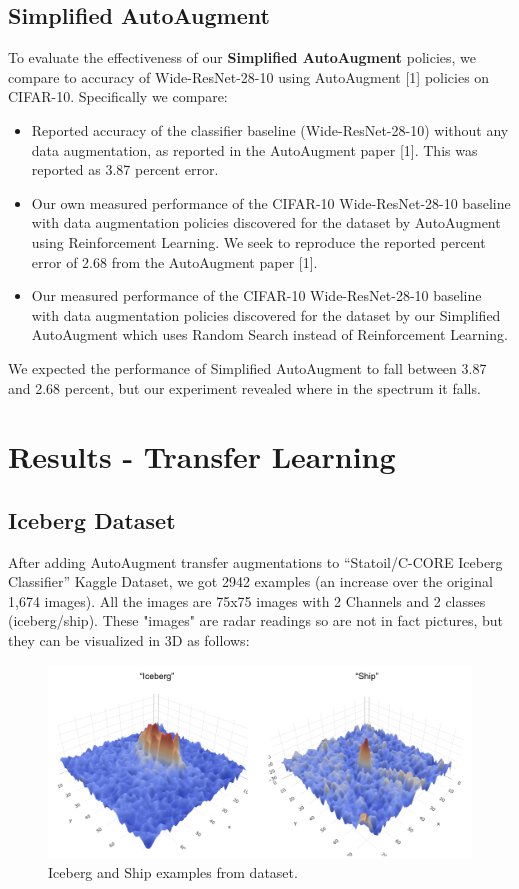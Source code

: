 \documentclass[10pt,twocolumn,letterpaper]{article}
\begin{document}
\subsection{Simplified AutoAugment}

To evaluate the effectiveness of our \textbf{Simplified AutoAugment} policies, we compare to accuracy of Wide-ResNet-28-10 using AutoAugment [1] policies on CIFAR-10.  Specifically we compare:

\begin{itemize}
  \item Reported accuracy of the classifier baseline (Wide-ResNet-28-10) without any data augmentation, as reported in the AutoAugment paper [1].  This was reported as 3.87 percent error.
  \item Our own measured performance of the CIFAR-10 Wide-ResNet-28-10 baseline with data augmentation policies discovered for the dataset by AutoAugment using Reinforcement Learning.  We seek to reproduce the reported percent error of 2.68 from the AutoAugment paper [1].
  \item Our measured performance of the  CIFAR-10 Wide-ResNet-28-10 baseline with data augmentation policies discovered for the dataset by our Simplified AutoAugment which uses Random Search instead of Reinforcement Learning.  
\end{itemize}
We expected the performance of Simplified AutoAugment to fall between 3.87 and 2.68 percent, but our experiment revealed where in the spectrum it falls.

\section{Results - Transfer Learning}

\subsection{Iceberg Dataset}

After adding AutoAugment transfer augmentations to “Statoil/C-CORE Iceberg Classifier” Kaggle Dataset, we got 2942 examples (an increase over the original 1,674 images). All the images are 75x75 images with 2 Channels and 2 classes (iceberg/ship).  These "images" are radar readings so are not in fact pictures,  but they can be visualized in 3D as follows:

\begin{figure}[bhp]
\includegraphics[width=\columnwidth]{iceberg_ship_example.png}
\caption{Iceberg and Ship examples from dataset.}
\end{figure}
\end{document}
